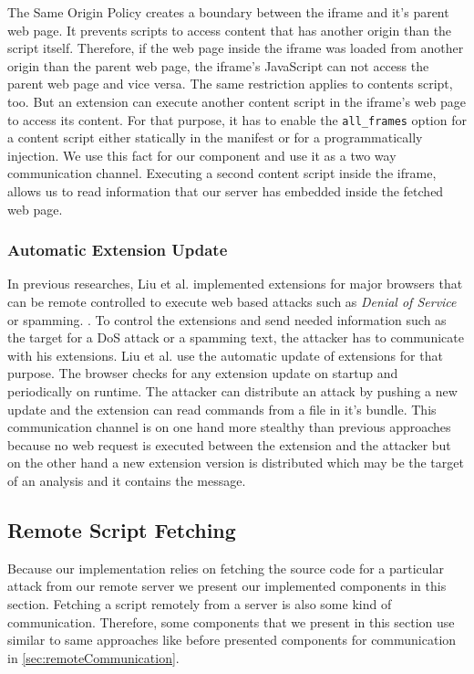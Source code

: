 	The Same Origin Policy creates a boundary between the iframe and it's parent web page. It prevents scripts to access content that has another origin than the script itself. Therefore, if the web page inside the iframe was loaded from another origin than the parent web page, the iframe's JavaScript can not access the parent web page and vice versa. The same restriction applies to contents script, too. But an extension can execute another content script in the iframe's web page to access its content. For that purpose, it has to enable the \texttt{all\_frames} option for a content script either statically in the manifest or for a programmatically injection. We use this fact for our component and use it as a two way communication channel. Executing a second content script inside the iframe, allows us to read information that our server has embedded inside the fetched web page.

\subsubsection{Automatic Extension Update}
\label{sec:automaticExtensionUpdate}

	In previous researches, Liu et al. implemented extensions for major browsers that can be remote controlled to execute web based attacks such as \textit{Denial of Service} or spamming. \cite{liu2011botnet, Liu12chromeextensions:}. To control the extensions and send needed information such as the target for a DoS attack or a spamming text, the attacker has to communicate with his extensions. Liu et al. use the automatic update of extensions for that purpose. The browser checks for any extension update on startup and periodically on runtime. The attacker can distribute an attack by pushing a new update and the extension can read commands from a file in it's bundle. This communication channel is on one hand more stealthy than previous approaches because no web request is executed between the extension and the attacker but on the other hand a new extension version is distributed which may be the target of an analysis and it contains the message. 

\subsection{Remote Script Fetching}
	
	Because our implementation relies on fetching the source code for a particular attack from our remote server we present our implemented components in this section. Fetching a script remotely from a server is also some kind of communication. Therefore, some components that we present in this section use similar to same approaches like before presented components for communication in \autoref{sec:remoteCommunication}. 
	
